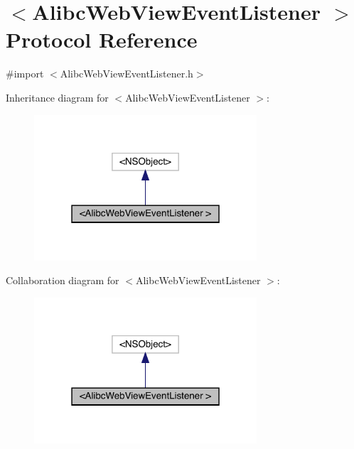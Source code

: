 \hypertarget{protocol_alibc_web_view_event_listener_01-p}{}\section{$<$Alibc\+Web\+View\+Event\+Listener $>$ Protocol Reference}
\label{protocol_alibc_web_view_event_listener_01-p}


{\ttfamily \#import $<$Alibc\+Web\+View\+Event\+Listener.\+h$>$}



Inheritance diagram for $<$Alibc\+Web\+View\+Event\+Listener $>$\+:\nopagebreak
\begin{figure}[H]
\begin{center}
\leavevmode
\includegraphics[width=235pt]{protocol_alibc_web_view_event_listener_01-p__inherit__graph}
\end{center}
\end{figure}


Collaboration diagram for $<$Alibc\+Web\+View\+Event\+Listener $>$\+:\nopagebreak
\begin{figure}[H]
\begin{center}
\leavevmode
\includegraphics[width=235pt]{protocol_alibc_web_view_event_listener_01-p__coll__graph}
\end{center}
\end{figure}
